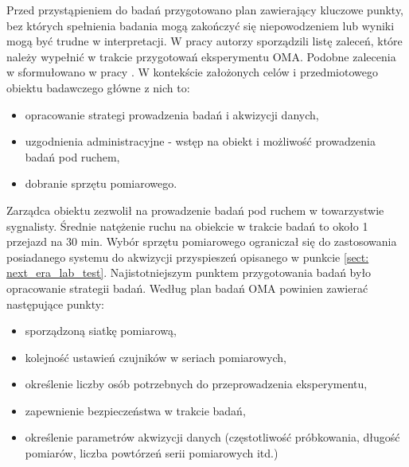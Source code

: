 Przed przystąpieniem do badań przygotowano plan zawierający kluczowe punkty, bez których spełnienia badania mogą zakończyć się niepowodzeniem lub wyniki mogą być trudne w interpretacji. W pracy \cite{Brincker2015} autorzy sporządzili listę zaleceń, które należy wypełnić w trakcie przygotowań eksperymentu OMA. Podobne zalecenia w sformułowano w pracy \cite{Poprawa2018}. W kontekście założonych celów i przedmiotowego obiektu badawczego główne z nich to:
\begin{itemize}
\item opracowanie strategi prowadzenia badań i akwizycji danych,
\item uzgodnienia administracyjne - wstęp na obiekt i możliwość prowadzenia badań pod ruchem,
\item dobranie sprzętu pomiarowego.
\end{itemize}

Zarządca obiektu zezwolił na prowadzenie badań pod ruchem w towarzystwie sygnalisty. Średnie natężenie ruchu na obiekcie w trakcie badań to około 1 przejazd na 30 min. Wybór sprzętu pomiarowego ograniczał się do zastosowania posiadanego systemu do akwizycji przyspieszeń opisanego w punkcie \ref{sect: next_era_lab_test}. Najistotniejszym punktem przygotowania badań było opracowanie strategii badań. Według \cite{Brincker2015} plan badań OMA powinien zawierać następujące punkty:
\begin{itemize}
	\item sporządzoną siatkę pomiarową,
	\item kolejność ustawień czujników w seriach pomiarowych,
	\item określenie liczby osób potrzebnych do przeprowadzenia eksperymentu,
	\item zapewnienie bezpieczeństwa w trakcie badań,
	\item określenie parametrów akwizycji danych (częstotliwość próbkowania, długość pomiarów, liczba powtórzeń serii pomiarowych itd.)
\end{itemize}


